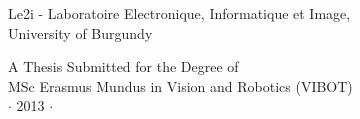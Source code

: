 \vspace{1cm}
\begin{center}
\normalsize{
Le2i - Laboratoire Electronique, Informatique et Image, \\
University of Burgundy}
\end{center}



\vspace{4cm}
\begin{center}
{\large A Thesis Submitted for the Degree of \\MSc Erasmus Mundus
in Vision and Robotics (VIBOT) \\\vspace{0.3cm} $\cdot$ 2013
$\cdot$}
\end{center}
\singlespacing









